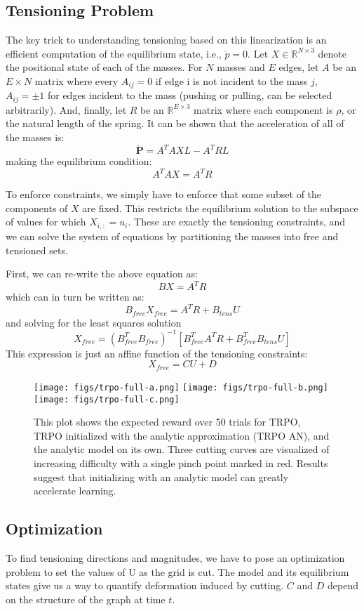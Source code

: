 \subsection{Tensioning Problem}
The key trick to understanding tensioning based on this linearization is an efficient computation of the equilibrium state, i.e., $\ddot{p} = 0$.
Let $X \in \mathbb{R}^{N \times 3}$ denote the positional state of each of the masses.
For $N$ masses and $E$ edges, let $A$ be an $E \times N$ matrix where every $A_{ij} = 0$ if edge i is not incident to the mass $j$, $A_{ij} = \pm 1$ for edges incident to the mass (pushing or pulling, can be selected arbitrarily).
And, finally, let $R$ be an $\mathbb{R}^{E \times 3}$ matrix where each component is $\rho$, or the natural length of the spring.
It can be shown that the acceleration of all of the masses is:
\[
\ddot{\mathbf{P}} =  A^T A X L - A^T R L 
\]
making the equilibrium condition:
\[
 A^T A X  =  A^T R 
\]

To enforce constraints, we simply have to enforce that some subset of the components of $X$ are fixed.
This restricts the equilibrium solution to the subspace of values for which $X_{i,:} = u_i$.
These are exactly the tensioning constraints, and we can solve the system of equations by partitioning the masses into free and tensioned sets.

First, we can re-write the above equation as:
\[
B X =  A^T R
\]
which can in turn be written as:
\[
B_{free} X_{free}  = A^T R + B_{tens} U
\]
and solving for the least squares solution
\[
X_{free}  = (B_{free}^T B_{free})^{-1} [B_{free}^T A^T R + B_{free}^T B_{tens} U]
\]
This expression is just an affine function of the tensioning constraints:
\[
X_{free}  = C U + D
\]

\begin{figure*}[t]
\texttt{[image: figs/trpo-full-a.png]}
\texttt{[image: figs/trpo-full-b.png]}
\texttt{[image: figs/trpo-full-c.png]}
\caption{This plot shows the expected reward over 50 trials for TRPO, TRPO initialized with the analytic approximation (TRPO AN), and the analytic model on its own. Three cutting curves are visualized of increasing difficulty with a single pinch point marked in red. Results suggest that initializing with an analytic model can greatly accelerate learning.\label{fig:1}}
\end{figure*}

\subsection{Optimization}
To find tensioning directions and magnitudes, we have to pose an optimization problem to set the values of U as the grid is cut.
The model and its equilibrium states give us a way to quantify deformation induced by cutting.
$C$ and $D$ depend on the structure of the graph at time $t$.

